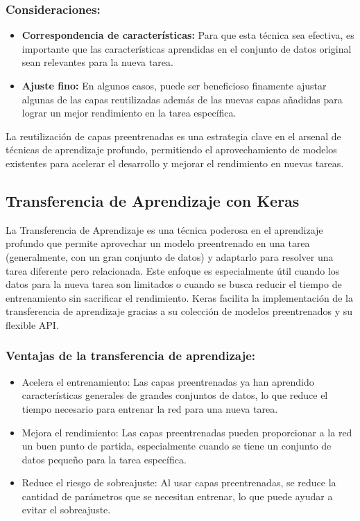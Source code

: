 \documentclass[11pt]{article}
\begin{document}
\subsubsection{Consideraciones:}
\label{sec:org9043599}
\begin{itemize}
\item \textbf{Correspondencia de características:} Para que esta técnica sea
efectiva, es importante que las características aprendidas en el
conjunto de datos original sean relevantes para la nueva tarea.
\item \textbf{Ajuste fino:} En algunos casos, puede ser beneficioso finamente
ajustar algunas de las capas reutilizadas además de las nuevas capas
añadidas para lograr un mejor rendimiento en la tarea específica.
\end{itemize}

La reutilización de capas preentrenadas es una estrategia clave en el
arsenal de técnicas de aprendizaje profundo, permitiendo el
aprovechamiento de modelos existentes para acelerar el desarrollo y
mejorar el rendimiento en nuevas tareas.

\subsection{Transferencia de Aprendizaje con Keras}
\label{sec:org158c920}
La Transferencia de Aprendizaje es una técnica poderosa en el
aprendizaje profundo que permite aprovechar un modelo preentrenado en
una tarea (generalmente, con un gran conjunto de datos) y adaptarlo para
resolver una tarea diferente pero relacionada. Este enfoque es
especialmente útil cuando los datos para la nueva tarea son limitados o
cuando se busca reducir el tiempo de entrenamiento sin sacrificar el
rendimiento. Keras facilita la implementación de la transferencia de
aprendizaje gracias a su colección de modelos preentrenados y su
flexible API.

\subsubsection{Ventajas de la transferencia de aprendizaje:}
\label{sec:orga4f677e}
\begin{itemize}
\item Acelera el entrenamiento: Las capas preentrenadas ya han aprendido
características generales de grandes conjuntos de datos, lo que reduce
el tiempo necesario para entrenar la red para una nueva tarea.
\item Mejora el rendimiento: Las capas preentrenadas pueden proporcionar a
la red un buen punto de partida, especialmente cuando se tiene un
conjunto de datos pequeño para la tarea específica.
\item Reduce el riesgo de sobreajuste: Al usar capas preentrenadas, se
reduce la cantidad de parámetros que se necesitan entrenar, lo que
puede ayudar a evitar el sobreajuste.
\end{itemize}
\end{document}
